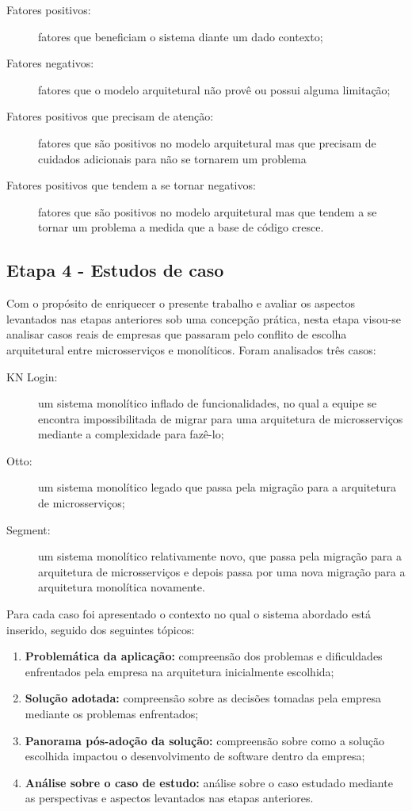 \begin{description}
    \item[Fatores positivos:] fatores que beneficiam o sistema diante um dado contexto;
    \item[Fatores negativos:] fatores que o modelo arquitetural não provê ou possui alguma limitação;
    \item[Fatores positivos que precisam de atenção:] fatores que são positivos no modelo
        arquitetural mas que precisam de cuidados adicionais para não se tornarem um problema
    \item[Fatores positivos que tendem a se tornar negativos:] fatores que são positivos no modelo
        arquitetural mas que tendem a se tornar um problema a medida que a base de código cresce.
\end{description}

\subsection{Etapa 4 - Estudos de caso}

Com o propósito de enriquecer o presente trabalho e avaliar os aspectos levantados nas etapas
anteriores sob uma concepção prática, nesta etapa visou-se analisar casos reais de empresas que
passaram pelo conflito de escolha arquitetural entre microsserviços e monolíticos. Foram analisados
três casos:

\begin{description}
    \item[KN Login:] um sistema monolítico inflado de funcionalidades, no qual a equipe se encontra
        impossibilitada de migrar para uma arquitetura de microsserviços mediante a complexidade
        para fazê-lo;
    \item[Otto:] um sistema monolítico legado que passa pela migração para a arquitetura de
        microsserviços;
    \item[Segment:] um sistema monolítico relativamente novo, que passa pela migração para a
        arquitetura de microsserviços e depois passa por uma nova migração para a arquitetura
        monolítica novamente.
\end{description}

Para cada caso foi apresentado o contexto no qual o sistema abordado está inserido, seguido dos
seguintes tópicos:

\begin{enumerate}
    \item \textbf{Problemática da aplicação:} compreensão dos problemas e dificuldades enfrentados
        pela empresa na arquitetura inicialmente escolhida;
    \item \textbf{Solução adotada:} compreensão sobre as decisões tomadas pela empresa mediante os
        problemas enfrentados;
    \item \textbf{Panorama pós-adoção da solução:} compreensão sobre como a solução escolhida
        impactou o desenvolvimento de software dentro da empresa;
    \item \textbf{Análise sobre o caso de estudo:} análise sobre o caso estudado mediante as
        perspectivas e aspectos levantados nas etapas anteriores.
\end{enumerate}

